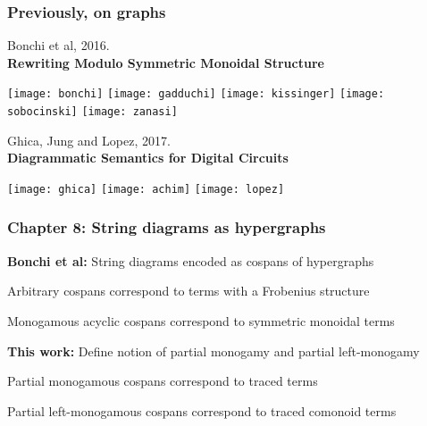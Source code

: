 \begin{frame}
    \frametitle{Previously, on graphs}

    \pause

    \begin{minipage}{0.65\textwidth}
        Bonchi et al, 2016. \\ \textbf{Rewriting Modulo Symmetric Monoidal Structure}
    \end{minipage}
    \quad
    \begin{minipage}{0.3\textwidth}
        \texttt{[image: bonchi]}
        \texttt{[image: gadduchi]}
        \texttt{[image: kissinger]}
        \texttt{[image: sobocinski]}
        \texttt{[image: zanasi]}
    \end{minipage}

    \vspace{2em}
    \pause

    \begin{minipage}{0.65\textwidth}
        Ghica, Jung and Lopez, 2017. \\ \textbf{Diagrammatic Semantics for Digital Circuits}
    \end{minipage}
    \quad
    \begin{minipage}{0.3\textwidth}
        \texttt{[image: ghica]}
        \texttt{[image: achim]}
        \texttt{[image: lopez]}
    \end{minipage}

\end{frame}

\begin{frame}
    \frametitle{Chapter 8: String diagrams as hypergraphs}

    \pause

    \textbf{Bonchi et al:}
    String diagrams encoded as \alert{cospans of hypergraphs}

    \pause

    Arbitrary cospans correspond to terms with a \alert{Frobenius} structure

    \pause

    \alert{Monogamous acyclic} cospans correspond to
    \alert{symmetric monoidal} terms

    \vspace{2em}

    \pause

    \textbf{This work:}
    Define notion of \alert{partial monogamy} and \alert{partial left-monogamy}

    \pause

    \alert{Partial monogamous} cospans correspond to
    \alert{traced} terms

    \pause

    \alert{Partial left-monogamous} cospans correspond to
    \alert{traced comonoid} terms
\end{frame}

